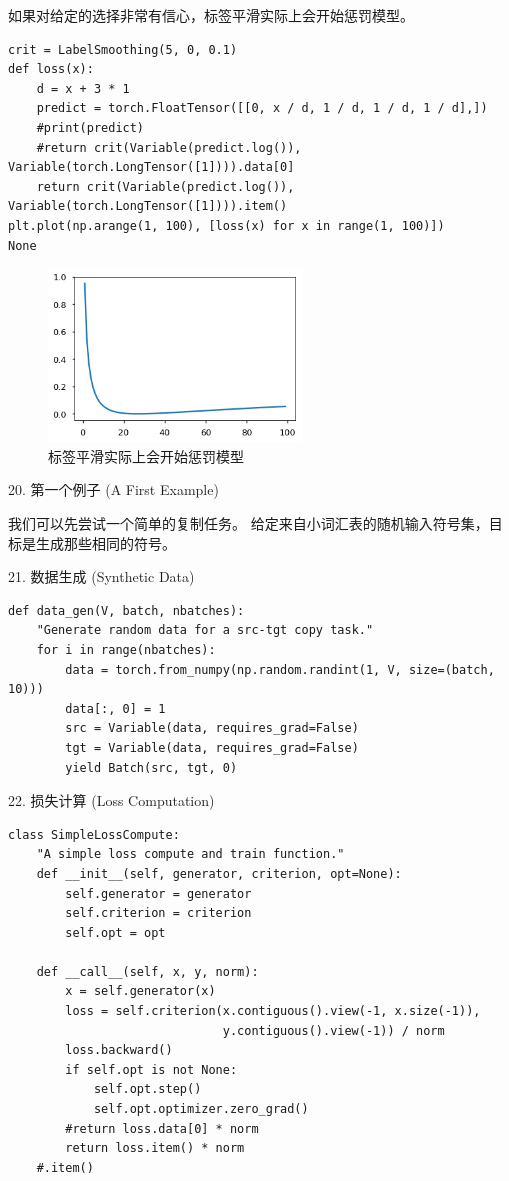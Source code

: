 如果对给定的选择非常有信心，标签平滑实际上会开始惩罚模型。

\begin{Verbatim}
crit = LabelSmoothing(5, 0, 0.1)
def loss(x):
    d = x + 3 * 1
    predict = torch.FloatTensor([[0, x / d, 1 / d, 1 / d, 1 / d],])
    #print(predict)
    #return crit(Variable(predict.log()), Variable(torch.LongTensor([1]))).data[0]
    return crit(Variable(predict.log()), Variable(torch.LongTensor([1]))).item()
plt.plot(np.arange(1, 100), [loss(x) for x in range(1, 100)])
None
\end{Verbatim}

\begin{figure}[htb]
\centering 
\includegraphics[width=0.6\textwidth]{img/n8.png} 
\caption{标签平滑实际上会开始惩罚模型}
\label{Test}
\end{figure}

20. 第一个例子 (A First Example)

我们可以先尝试一个简单的复制任务。 给定来自小词汇表的随机输入符号集，目标是生成那些相同的符号。

21. 数据生成 (Synthetic Data)

\begin{Verbatim}
def data_gen(V, batch, nbatches):
    "Generate random data for a src-tgt copy task."
    for i in range(nbatches):
        data = torch.from_numpy(np.random.randint(1, V, size=(batch, 10)))
        data[:, 0] = 1
        src = Variable(data, requires_grad=False)
        tgt = Variable(data, requires_grad=False)
        yield Batch(src, tgt, 0)
\end{Verbatim}

22. 损失计算 (Loss Computation)

\begin{Verbatim}
class SimpleLossCompute:
    "A simple loss compute and train function."
    def __init__(self, generator, criterion, opt=None):
        self.generator = generator
        self.criterion = criterion
        self.opt = opt
        
    def __call__(self, x, y, norm):
        x = self.generator(x)
        loss = self.criterion(x.contiguous().view(-1, x.size(-1)), 
                              y.contiguous().view(-1)) / norm
        loss.backward()
        if self.opt is not None:
            self.opt.step()
            self.opt.optimizer.zero_grad()
        #return loss.data[0] * norm
        return loss.item() * norm
    #.item()
\end{Verbatim}

